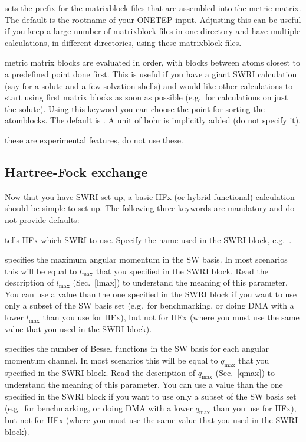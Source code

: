 \documentclass[letterpaper,10pt,english]{sphinxmanual}
\begin{document}
 \textendash{} sets the prefix for the matrixblock
files that are assembled into the metric matrix. The default is the
rootname of your ONETEP input. Adjusting this can be useful if you keep
a large number of matrixblock files in one directory and have multiple
calculations, in different directories, using these matrixblock files.

 \textendash{} metric
matrix blocks are evaluated in order, with blocks between atoms closest
to a predefined point done first. This is useful if you have a giant
SWRI calculation (say for a solute and a few solvation shells) and would
like other calculations to start using first matrix blocks as soon as
possible (e.g. for calculations on just the solute). Using this keyword
you can choose the point for sorting the atomblocks. The default is
. A unit of bohr is implicitly added (do not specify it).

 \textendash{}
these are experimental features, do not use these.


\subsection{Hartree-Fock exchange}
\label{\detokenize{hfx:hartree-fock-exchange}}
Now that you have SWRI set up, a basic HFx (or hybrid functional)
calculation should be simple to set up. The following three keywords are
mandatory and do not provide defaults:

 \textendash{} tells HFx which SWRI to use. Specify the name
used in the SWRI block, e.g. .

 \textendash{} specifies the maximum angular momentum in the
SW basis. In most scenarios this will be equal to
\(l_{\textrm{max}}\) that you specified in the SWRI block. Read the
description of \(l_{\textrm{max}}\) (Sec. {[}lmax{]}) to understand the
meaning of this parameter. You can use a  value than the one
specified in the SWRI block if you want to use only a subset of the SW
basis set (e.g. for benchmarking, or doing DMA with a lower
\(l_{\textrm{max}}\) than you use for HFx), but not for HFx (where
you must use the same value that you used in the SWRI block).

 \textendash{} specifies the number of Bessel functions in
the SW basis for each angular momentum channel. In most scenarios this
will be equal to \(q_{\textrm{max}}\) that you specified in the SWRI
block. Read the description of \(q_{\textrm{max}}\) (Sec. {[}qmax{]}) to
understand the meaning of this parameter. You can use a  value
than the one specified in the SWRI block if you want to use only a
subset of the SW basis set (e.g. for benchmarking, or doing DMA with a
lower \(q_{\textrm{max}}\) than you use for HFx), but not for HFx
(where you must use the same value that you used in the SWRI block).
\end{document}
